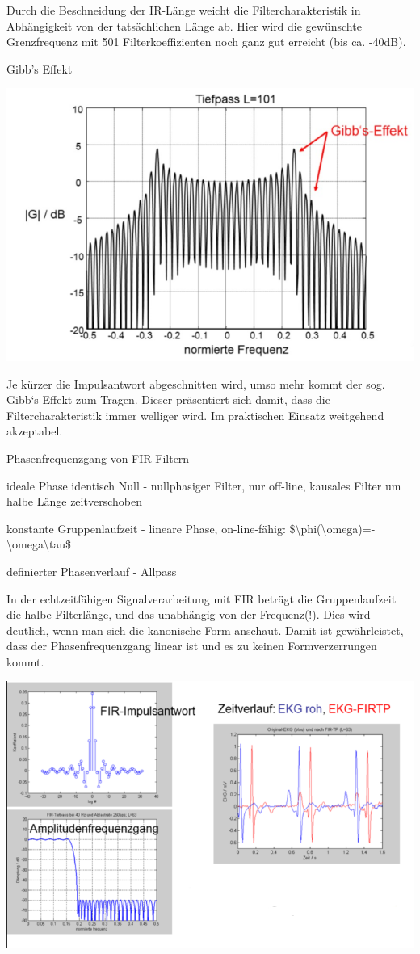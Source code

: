 \documentclass[a4paper]{article}
\begin{document}
\begin{multicols}{3}
\begin{itemize*}
\begin{itemize*}
      \item Durch die Beschneidung der IR-Länge weicht die Filtercharakteristik in Abhängigkeit von der tatsächlichen Länge ab. Hier wird die gewünschte Grenzfrequenz mit 501 Filterkoeffizienten noch ganz gut erreicht (bis ca. -40dB).
    \end{itemize*}
    \item Gibb's Effekt
    \begin{itemize*}
      \item \includegraphics[width=.5\linewidth]{Assets/Biosignalverarbeitung-gibbs-effekt.png}
      \item Je kürzer die Impulsantwort abgeschnitten wird, umso mehr kommt der sog. Gibb`s-Effekt zum Tragen. Dieser präsentiert sich damit, dass die Filtercharakteristik immer welliger wird. Im praktischen Einsatz weitgehend akzeptabel.
    \end{itemize*}
  \end{itemize*}

  Phasenfrequenzgang von FIR Filtern

  \begin{itemize*}
    \item ideale Phase identisch Null - nullphasiger Filter, nur off-line, kausales Filter um halbe Länge zeitverschoben
    \item konstante Gruppenlaufzeit - lineare Phase, on-line-fähig: \$\textbackslash phi(\textbackslash omega)=-\textbackslash omega\textbackslash tau\$
    \item definierter Phasenverlauf - Allpass
    \item In der echtzeitfähigen Signalverarbeitung mit FIR beträgt die Gruppenlaufzeit die halbe Filterlänge, und das unabhängig von der Frequenz(!). Dies wird deutlich, wenn man sich die kanonische Form anschaut. Damit ist gewährleistet, dass der Phasenfrequenzgang linear ist und es zu keinen Formverzerrungen kommt.
  \end{itemize*}

  \includegraphics[width=.5\linewidth]{Assets/Biosignalverarbeitung-fir-tiefpass-4.png}


\end{multicols}
\end{document}
